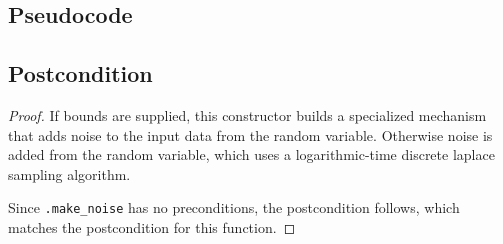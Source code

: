 \documentclass{article}
\begin{document}
\subsection*{Pseudocode}


\subsection*{Postcondition}
\begin{theorem}
\end{theorem}

\begin{proof}
    If bounds are supplied, this constructor builds a specialized mechanism
    that adds noise to the input data from the  random variable.
    Otherwise noise is added from the  random variable,
    which uses a logarithmic-time discrete laplace sampling algorithm.

    Since \texttt{.make\_noise} has no preconditions,
    the postcondition follows, which matches the postcondition for this function.
\end{proof}
\end{document}
